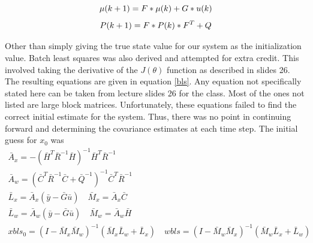 \documentclass[12pt]{extarticle}
\begin{document}
{{\begin{equation}\label{mean}\centering
    \mu(k+1)=F*\mu(k)+G*u(k)
\end{equation}
\begin{equation}\label{covariance}\centering
    P(k+1)=F*P(k)*F^T+Q
\end{equation}

Other than simply giving the true state value for our system as the initialization value. Batch least squares was also derived and attempted for extra credit. This involved taking the derivative of the $J(\theta)$ function as described in slides 26. The resulting equations are given in equation \ref{bls}. Any equation not specifically stated here can be taken from lecture slides 26 for the class. Most of the ones not listed are large block matrices. Unfortunately, these equations failed to find the correct initial estimate for the system. Thus, there was no point in continuing forward and determining the covariance estimates at each time step. The initial guess for $x_0$ was
\begin{equation}\label{bls}
\begin{split}
    \bar{A}_x=-(\bar{H}^T\bar{R}^{-1}\bar{H})^{-1}\bar{H}^T\bar{R}^{-1}\\
    \bar{A}_w=(\bar{C}^T\bar{R}^{-1}\bar{C}+\bar{Q}^{-1})^{-1}\bar{C}^T\bar{R}^{-1}\\
    \bar{L}_x=\bar{A}_x(\bar{y}-\bar{G}\bar{u})\quad \bar{M}_x=\bar{A}_x\bar{C}\\
    \bar{L}_w=\bar{A}_w(\bar{y}-\bar{G}\bar{u})\quad \bar{M}_w=\bar{A}_w\bar{H}\\
    xbls_0=(I-\bar{M}_x\bar{M}_w)^{-1}(\bar{M}_x\bar{L}_w+\bar{L}_x)\quad wbls=(I-\bar{M}_w\bar{M}_x)^{-1}(\bar{M}_w\bar{L}_x+\bar{L}_w)
\end{split}
\end{equation}
}



}
\end{document}
